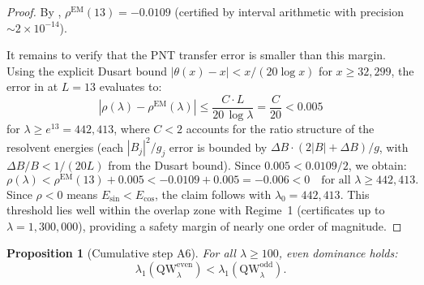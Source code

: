 \documentclass[12pt,a4paper]{article}
\newtheorem{proposition}[theorem]{Proposition}
\theoremstyle{definition}
\theoremstyle{remark}
\begin{document}
\begin{proof}
By , $\rho^{\mathrm{EM}}(13) = -0.0109$ (certified by interval arithmetic with precision $\sim 2 \times 10^{-14}$).

It remains to verify that the PNT transfer error is smaller than this margin. Using the explicit Dusart bound \cite{Dusart2010} $|\theta(x) - x| < x/(20\log x)$ for $x \geq 32{,}299$, the error in  at $L = 13$ evaluates to:
\[
  |\rho(\lambda) - \rho^{\mathrm{EM}}(\lambda)| \leq \frac{C \cdot L}{20\,\log\lambda} = \frac{C}{20} < 0.005
\]
for $\lambda \geq e^{13} = 442{,}413$, where $C < 2$ accounts for the ratio structure of the resolvent energies (each $|B_j|^2/g_j$ error is bounded by $\Delta B \cdot (2|B| + \Delta B)/g$, with $\Delta B/B < 1/(20L)$ from the Dusart bound). Since $0.005 < 0.0109/2$, we obtain:
\[
  \rho(\lambda) < \rho^{\mathrm{EM}}(13) + 0.005 < -0.0109 + 0.005 = -0.006 < 0 \quad\text{for all } \lambda \geq 442{,}413.
\]
Since $\rho < 0$ means $E_{\sin} < E_{\cos}$, the claim follows with $\lambda_0 = 442{,}413$. This threshold lies well within the overlap zone with Regime~1 (certificates up to $\lambda = 1{,}300{,}000$), providing a safety margin of nearly one order of magnitude.
\end{proof}

\begin{proposition}[Cumulative step A6]
\label{prop:A6}
For all $\lambda \geq 100$, even dominance holds:
\[
  \lambda_1(\mathrm{QW}_\lambda^{\mathrm{even}}) < \lambda_1(\mathrm{QW}_\lambda^{\mathrm{odd}}).
\]
\end{proposition}
\end{document}
